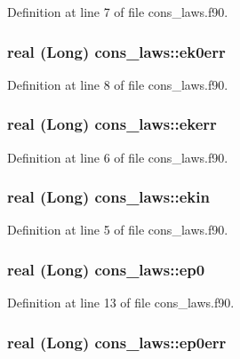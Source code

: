 Definition at line 7 of file cons\_\-laws.f90.

\hypertarget{namespacecons__laws_a2d6e39be272e86946cd52d0596c6bc3a}{
\subsubsection[{ek0err}]{\setlength{\rightskip}{0pt plus 5cm}real (Long) {\bf cons\_\-laws::ek0err}}}
\label{namespacecons__laws_a2d6e39be272e86946cd52d0596c6bc3a}


Definition at line 8 of file cons\_\-laws.f90.

\hypertarget{namespacecons__laws_aaaca27b785c52ee051b7f12c73182924}{
\subsubsection[{ekerr}]{\setlength{\rightskip}{0pt plus 5cm}real (Long) {\bf cons\_\-laws::ekerr}}}
\label{namespacecons__laws_aaaca27b785c52ee051b7f12c73182924}


Definition at line 6 of file cons\_\-laws.f90.

\hypertarget{namespacecons__laws_a8d6ef7d1726b52d17e21c62607c22c3b}{
\subsubsection[{ekin}]{\setlength{\rightskip}{0pt plus 5cm}real (Long) {\bf cons\_\-laws::ekin}}}
\label{namespacecons__laws_a8d6ef7d1726b52d17e21c62607c22c3b}


Definition at line 5 of file cons\_\-laws.f90.

\hypertarget{namespacecons__laws_a1241ed7a0d2ec35982d18efa725fd588}{
\subsubsection[{ep0}]{\setlength{\rightskip}{0pt plus 5cm}real (Long) {\bf cons\_\-laws::ep0}}}
\label{namespacecons__laws_a1241ed7a0d2ec35982d18efa725fd588}


Definition at line 13 of file cons\_\-laws.f90.

\hypertarget{namespacecons__laws_a9552ba8aaa6ba5048797e3dcabad3eb4}{
\subsubsection[{ep0err}]{\setlength{\rightskip}{0pt plus 5cm}real (Long) {\bf cons\_\-laws::ep0err}}}
\label{namespacecons__laws_a9552ba8aaa6ba5048797e3dcabad3eb4}


